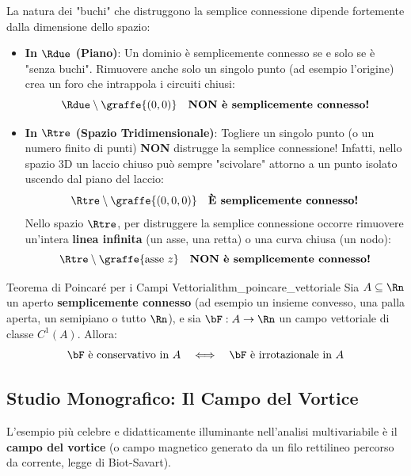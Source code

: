 \begin{esame}
La natura dei "buchi" che distruggono la semplice connessione dipende fortemente dalla dimensione dello spazio:
\begin{itemize}
    \item \textbf{In $\Rdue$ (Piano)}: Un dominio è semplicemente connesso se e solo se è "senza buchi". Rimuovere anche solo un singolo punto (ad esempio l'origine) crea un foro che intrappola i circuiti chiusi:
    \[
    \Rdue \setminus \graffe{(0,0)} \quad \textbf{NON è semplicemente connesso!}
    \]
    \item \textbf{In $\Rtre$ (Spazio Tridimensionale)}: Togliere un singolo punto (o un numero finito di punti) \textbf{NON} distrugge la semplice connessione! Infatti, nello spazio 3D un laccio chiuso può sempre "scivolare" attorno a un punto isolato uscendo dal piano del laccio:
    \[
    \Rtre \setminus \graffe{(0,0,0)} \quad \textbf{È semplicemente connesso!}
    \]
    Nello spazio $\Rtre$, per distruggere la semplice connessione occorre rimuovere un'intera \textbf{linea infinita} (un asse, una retta) o una curva chiusa (un nodo):
    \[
    \Rtre \setminus \graffe{\text{asse } z} \quad \textbf{NON è semplicemente connesso!}
    \]
\end{itemize}
\end{esame}

\begin{teorema}{Teorema di Poincar\'e per i Campi Vettoriali}{thm_poincare_vettoriale}
Sia $A \subseteq \Rn$ un aperto \textbf{semplicemente connesso} (ad esempio un insieme convesso, una palla aperta, un semipiano o tutto $\Rn$), e sia $\bF: A \to \Rn$ un campo vettoriale di classe $C^1(A)$.
Allora:
\[
\bF \text{ è conservativo in } A \quad \Longleftrightarrow \quad \bF \text{ è irrotazionale in } A
\]
\end{teorema}

\subsection{Studio Monografico: Il Campo del Vortice}

L'esempio più celebre e didatticamente illuminante nell'analisi multivariabile è il \textbf{campo del vortice} (o campo magnetico generato da un filo rettilineo percorso da corrente, legge di Biot-Savart).

